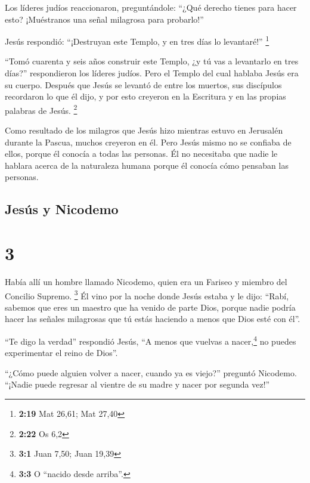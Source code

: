  Los líderes judíos reaccionaron, preguntándole: ``¿Qué
derecho tienes para hacer esto? ¡Muéstranos una señal milagrosa para
probarlo!''

 Jesús respondió: ``¡Destruyan este Templo, y en tres
días lo levantaré!'' \footnote{\textbf{2:19} Mat 26,61; Mat 27,40}

 ``Tomó cuarenta y seis años construir este Templo, ¿y tú
vas a levantarlo en tres días?'' respondieron los líderes judíos.
 Pero el Templo del cual hablaba Jesús era su cuerpo.
 Después que Jesús se levantó de entre los muertos, sus
discípulos recordaron lo que él dijo, y por esto creyeron en la
Escritura y en las propias palabras de Jesús. \footnote{\textbf{2:22} Os
  6,2}

 Como resultado de los milagros que Jesús hizo mientras
estuvo en Jerusalén durante la Pascua, muchos creyeron en él.
 Pero Jesús mismo no se confiaba de ellos, porque él
conocía a todas las personas.  Él no necesitaba que nadie
le hablara acerca de la naturaleza humana porque él conocía cómo
pensaban las personas.

\hypertarget{jesuxfas-y-nicodemo}{%
\subsection{Jesús y Nicodemo}\label{jesuxfas-y-nicodemo}}

\hypertarget{section-2}{%
\section{3}\label{section-2}}

 Había allí un hombre llamado Nicodemo, quien era un
Fariseo y miembro del Concilio Supremo. \footnote{\textbf{3:1} Juan
  7,50; Juan 19,39}  Él vino por la noche donde Jesús
estaba y le dijo: ``Rabí, sabemos que eres un maestro que ha venido de
parte Dios, porque nadie podría hacer las señales milagrosas que tú
estás haciendo a menos que Dios esté con él''.

 ``Te digo la verdad'' respondió Jesús, ``A menos que
vuelvas a nacer,\footnote{\textbf{3:3} O ``nacido desde arriba''.} no
puedes experimentar el reino de Dios''.

 ``¿Cómo puede alguien volver a nacer, cuando ya es
viejo?'' preguntó Nicodemo. ``¡Nadie puede regresar al vientre de su
madre y nacer por segunda vez!''

